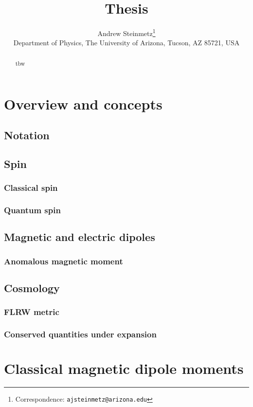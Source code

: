 \documentclass[a4paper]{report}
\title{Thesis}
\author{Andrew Steinmetz\orc{\orcC}\thanks{Correspondence: \texttt{ajsteinmetz@arizona.edu}}
\\ Department of Physics, The University of Arizona, Tucson, AZ 85721, USA}
\begin{document}
\maketitle

\begin{abstract}
    {tbw}
\end{abstract}


\chapter{Overview and concepts}
    \section{Notation}
    \section{Spin}
        \subsection{Classical spin}
        \subsection{Quantum spin}
    \section{Magnetic and electric dipoles}
        \subsection{Anomalous magnetic moment}
    \section{Cosmology}
        \subsection{FLRW metric}
        \subsection{Conserved quantities under expansion}

\chapter{Classical magnetic dipole moments}
\end{document}
